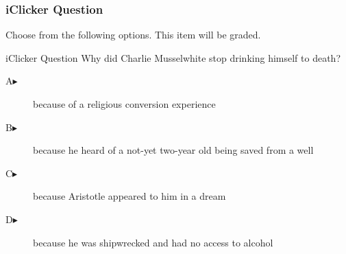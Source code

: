 \documentclass[xcolor=dvipsnames]{beamer}
\begin{document}
\begin{frame}
  \frametitle{iClicker Question}
Choose from the following options. This item will be graded.
\begin{block}{iClicker Question}
Why did Charlie Musselwhite stop drinking himself to death?
\end{block}
\begin{description}
\item[A\hspace{.2in}$\blacktriangleright$] because of a religious
  conversion experience
\item[B\hspace{.2in}$\blacktriangleright$] because he heard of a
  not-yet two-year old being saved from a well
\item[C\hspace{.2in}$\blacktriangleright$] because Aristotle
  appeared to him in a dream
\item[D\hspace{.2in}$\blacktriangleright$] because he was shipwrecked
  and had no access to alcohol
\end{description}
\end{frame}
\end{document}
